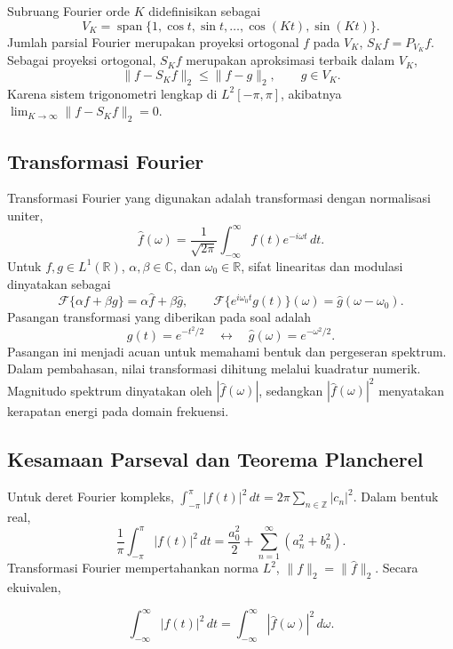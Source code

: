 \documentclass[11pt,a4paper]{article}
\begin{document}
Subruang Fourier orde $K$ didefinisikan sebagai
$$
  V_K
  =
  \operatorname{span}
  \{1,\cos t,\sin t,\ldots,\cos(Kt),\sin(Kt)\}.
$$
Jumlah parsial Fourier merupakan proyeksi ortogonal $f$ pada $V_K$,
$
  S_Kf=P_{V_K}f.
$
Sebagai proyeksi ortogonal, $S_Kf$ merupakan aproksimasi terbaik dalam $V_K$,
$$
  \|f-S_Kf\|_2
  \leq
  \|f-g\|_2,
  \qquad
  g\in V_K.
$$
Karena sistem trigonometri lengkap di $L^2[-\pi,\pi]$, akibatnya
$
  \lim_{K\to\infty}
  \|f-S_Kf\|_2
  =
  0.
$

\subsection{Transformasi Fourier} \label{sub transformasi fourier}
Transformasi Fourier yang digunakan adalah transformasi dengan normalisasi
uniter,
\begin{equation}
 \widehat f(\omega)=\frac1{\sqrt{2\pi}}
 \int_{-\infty}^{\infty}f(t)e^{-i\omega t}\,dt.
 \label{eq:konvensi}
\end{equation}
Untuk $f,g\in L^1(\mathbb R)$, $\alpha,\beta\in\mathbb C$, dan
$\omega_0\in\mathbb R$, sifat linearitas dan modulasi dinyatakan sebagai
\[
 \mathcal F\{\alpha f+\beta g\}=\alpha\widehat f+\beta\widehat g,
 \qquad
 \mathcal F\{e^{i\omega_0t}g(t)\}(\omega)=\widehat g(\omega-\omega_0).
\]
Pasangan transformasi yang diberikan pada soal adalah
\[
 g(t)=e^{-t^2/2}\quad\longleftrightarrow\quad
 \widehat g(\omega)=e^{-\omega^2/2}.
\]
Pasangan ini menjadi acuan untuk memahami bentuk dan pergeseran spektrum.
Dalam pembahasan, nilai transformasi dihitung melalui kuadratur numerik.
Magnitudo spektrum dinyatakan oleh $|\widehat f(\omega)|$, sedangkan
$|\widehat f(\omega)|^2$ menyatakan kerapatan energi pada domain frekuensi.

\subsection{Kesamaan Parseval dan Teorema Plancherel}\label{kesamaan parseval}

Untuk deret Fourier kompleks,
$
  \int_{-\pi}^{\pi}|f(t)|^2\,dt
  =
  2\pi
  \sum_{n\in\mathbb{Z}}|c_n|^2.
$
Dalam bentuk real,
$$
  \frac{1}{\pi}
  \int_{-\pi}^{\pi}|f(t)|^2\,dt
  =
  \frac{a_0^2}{2}
  +
  \sum_{n=1}^{\infty}
  \left(a_n^2+b_n^2\right).
$$
Transformasi Fourier mempertahankan norma $L^2$,
$
  \|f\|_2
  =
  \|\widehat{f}\|_2.
$
Secara ekuivalen,

$$
  \int_{-\infty}^{\infty}
  |f(t)|^2\,dt
  =
  \int_{-\infty}^{\infty}
  |\widehat{f}(\omega)|^2\,d\omega.
$$
\end{document}
